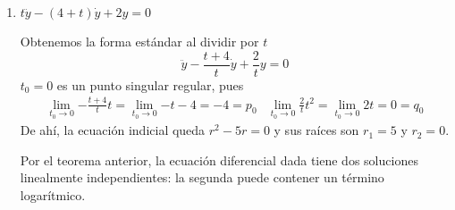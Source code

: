 \documentclass{article}
\begin{document}
\begin{enumerate}
        \item {
            $t\ddot y - (4 + t)\dot y + 2y = 0$

            \color{azul}
            Obtenemos la forma estándar al dividir por $t$
            $$\ddot y-\frac{t+4}{t}\dot y+\frac{2}{t}y=0$$
            $t_0=0$ es un punto singular regular, pues
            \begin{eqnarray*}
                \lim_{t_0\to 0}{-\frac{t+4}{t}t}=\lim_{t_0\to 0}{-t-4}=-4=p_0 &
                \lim_{t_0\to 0}{\frac{2}{t}t^2}=\lim_{t_0\to 0}{2t}=0=q_0
            \end{eqnarray*}
            De ahí, la ecuación indicial queda $r^2-5r=0$ y sus raíces son $r_1=5$ y $r_2=0$.

            Por el teorema anterior, la ecuación diferencial dada tiene dos soluciones linealmente independientes: la
            segunda puede contener un término logarítmico.

}
\end{enumerate}
\end{document}
